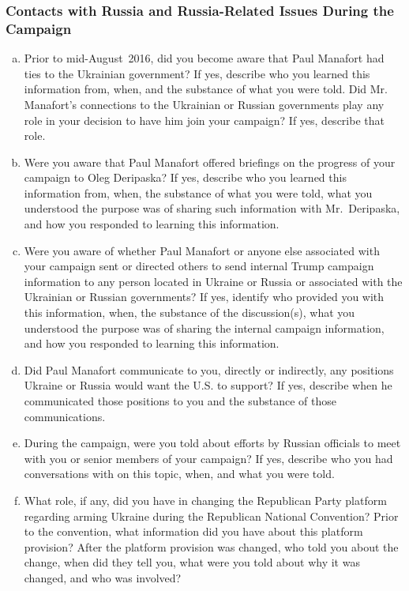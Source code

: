 \subsubsection{Contacts with Russia and Russia-Related Issues During the Campaign}

\begin{enumerate}[a.]

\item Prior to mid-August~2016, did you become aware that Paul Manafort had ties to the Ukrainian government?
If yes, describe who you learned this information from, when, and the substance of what you were told.
Did Mr. Manafort's connections to the Ukrainian or Russian governments play any role in your decision to have him join your campaign?
If yes, describe that role.

\item Were you aware that Paul Manafort offered briefings on the progress of your campaign to Oleg Deripaska?
If yes, describe who you learned this information from, when, the substance of what you were told, what you understood the purpose was of sharing such information with Mr.~Deripaska, and how you responded to learning this information.

\item Were you aware of whether Paul Manafort or anyone else associated with your campaign sent or directed others to send internal Trump campaign information to any person located in Ukraine or Russia or associated with the Ukrainian or Russian governments?
If yes, identify who provided you with this information, when, the substance of the discussion(s), what you understood the purpose was of sharing the internal campaign information, and how you responded to learning this information.

\item Did Paul Manafort communicate to you, directly or indirectly, any positions Ukraine or Russia would want the U.S. to support?
If yes, describe when he communicated those positions to you and the substance of those communications.

\item During the campaign, were you told about efforts by Russian officials to meet with you or senior members of your campaign?
If yes, describe who you had conversations with on this topic, when, and what you were told.

\item What role, if any, did you have in changing the Republican Party platform regarding arming Ukraine during the Republican National Convention?
Prior to the convention, what information did you have about this platform provision?
After the platform provision was changed, who told you about the change, when did they tell you, what were you told about why it was changed, and who was involved?


\end{enumerate}
